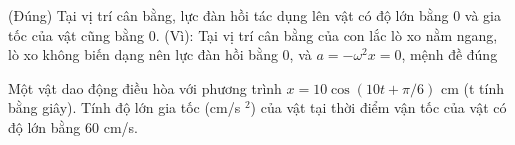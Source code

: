 \begin{ex}
{\begin{itemchoice}
\item (Đúng) Tại vị trí cân bằng, lực đàn hồi tác dụng lên vật có độ lớn bằng 0 và gia tốc của vật cũng bằng 0. (Vì): Tại vị trí cân bằng của con lắc lò xo nằm ngang, lò xo không biến dạng nên lực đàn hồi bằng 0, và $a = -\omega^2 x = 0$, mệnh đề đúng
\end{itemchoice}
}
\end{ex}

\begin{ex}
Một vật dao động điều hòa với phương trình $x = 10\cos(10t + \pi/6)$ cm (t tính bằng giây). Tính độ lớn gia tốc (cm/s $^2$) của vật tại thời điểm vận tốc của vật có độ lớn bằng $60$ cm/s.
\end{ex}

